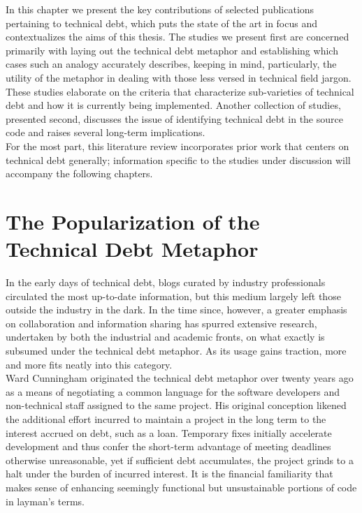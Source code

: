 



In this chapter we present the key contributions of selected publications pertaining to technical debt, which puts the state of the art in focus and contextualizes the aims of this thesis.  The studies we present first are concerned primarily with laying out the technical debt metaphor and establishing which cases such an analogy accurately describes, keeping in mind, particularly, the utility of the metaphor in dealing with those less versed in technical field jargon.  These studies elaborate on the criteria that characterize sub-varieties of technical debt and how it is currently being implemented.  Another collection of studies, presented second, discusses the issue of identifying technical debt in the source code and raises several long-term implications.\\

For the most part, this literature review incorporates prior work that centers on technical debt generally; information specific to the studies under discussion will accompany the following chapters.


\section{The Popularization of the Technical Debt Metaphor}

In the early days of technical debt, blogs curated by industry professionals circulated the most up-to-date information, but this medium largely left those outside the industry in the dark. In the time since, however, a greater emphasis on collaboration and information sharing has spurred extensive research, undertaken by both the industrial and academic fronts, on what exactly is subsumed under the technical debt metaphor. As its usage gains traction, more and more fits neatly into this category.\\

Ward Cunningham \cite{cunningham1993wycash} originated the technical debt metaphor over twenty years ago as a means of negotiating a common language for the software developers and non-technical staff assigned to the same project. His original conception likened the additional effort incurred to maintain a project in the long term to the interest accrued on debt, such as a loan. Temporary fixes initially accelerate development and thus confer the short-term advantage of meeting deadlines otherwise unreasonable, yet if sufficient debt accumulates, the project grinds to a halt under the burden of incurred interest. It is the financial familiarity that makes sense of enhancing seemingly functional but unsustainable portions of code in layman's terms.\\


